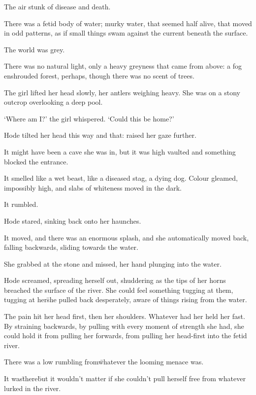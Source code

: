 

\prelude

The air stunk of disease and death.

There was a fetid body of water; murky water, that seemed half alive, that moved in odd patterns, as if 
small things swam against the current beneath the surface.

The world was grey.

There was no natural light, only a heavy greyness that came from above: a fog enshrouded forest, 
perhaps, though there was no scent of trees.

The girl lifted her head slowly, her antlers weighing heavy. She was on a stony outcrop overlooking a 
deep pool.

‘Where am I?’ the girl whispered. ‘Could this be home?’

\fugue

Hode tilted her head this way and that: raised her gaze further.

It might have been a cave she was in, but it was high vaulted and something blocked the entrance.

It smelled like a wet beast, like a diseased stag, a dying dog. Colour gleamed, impossibly high, and 
slabs of whiteness moved in the dark.

It rumbled.

Hode stared, sinking back onto her haunches.

It moved, and there was an enormous splash, and she automatically moved back, falling backwards, sliding 
towards the water.

She grabbed at the stone and missed, her hand plunging into the water.

Hode screamed, spreading herself out, shuddering as the tips of her horns breached the surface of the 
river. She could feel something tugging at them, tugging at her\=she pulled back desperately, aware of 
things rising from the water.

The pain hit her head first, then her shoulders. Whatever had her held her fast. By straining backwards, 
by pulling with every moment of strength she had, she could hold it from pulling her forwards, from 
pulling her head-first into the fetid river.

There was a low rumbling from\=whatever the looming menace was.

It was\=there\=but it wouldn’t matter if she couldn’t pull herself free from whatever lurked in the 
river.

